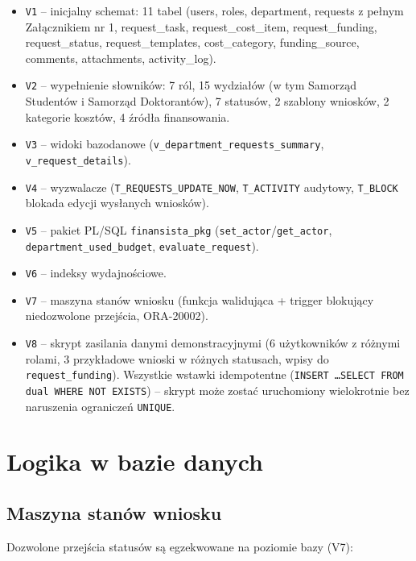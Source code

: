 \documentclass[12pt,a4paper]{article}
\begin{document}
\begin{itemize}[leftmargin=*]
  \item \texttt{V1} -- inicjalny schemat: 11 tabel (users, roles, department,
        requests z pełnym Załącznikiem nr 1, request\_task, request\_cost\_item,
        request\_funding, request\_status, request\_templates, cost\_category,
        funding\_source, comments, attachments, activity\_log).
  \item \texttt{V2} -- wypełnienie słowników: 7 ról, 15 wydziałów (w tym
        Samorząd Studentów i Samorząd Doktorantów), 7 statusów, 2 szablony
        wniosków, 2 kategorie kosztów, 4 źródła finansowania.
  \item \texttt{V3} -- widoki bazodanowe (\texttt{v\_department\_requests\_summary},
        \texttt{v\_request\_details}).
  \item \texttt{V4} -- wyzwalacze (\texttt{T\_REQUESTS\_UPDATE\_NOW},
        \texttt{T\_ACTIVITY} audytowy, \texttt{T\_BLOCK} blokada edycji wysłanych wniosków).
  \item \texttt{V5} -- pakiet PL/SQL \texttt{finansista\_pkg}
        (\texttt{set\_actor}/\texttt{get\_actor}, \texttt{department\_used\_budget},
        \texttt{evaluate\_request}).
  \item \texttt{V6} -- indeksy wydajnościowe.
  \item \texttt{V7} -- maszyna stanów wniosku (funkcja walidująca + trigger
        blokujący niedozwolone przejścia, ORA-20002).
  \item \texttt{V8} -- skrypt zasilania danymi demonstracyjnymi (6 użytkowników
        z różnymi rolami, 3 przykładowe wnioski w różnych statusach, wpisy
        do \texttt{request\_funding}). Wszystkie wstawki idempotentne
        (\texttt{INSERT \ldots SELECT FROM dual WHERE NOT EXISTS}) --
        skrypt może zostać uruchomiony wielokrotnie bez naruszenia
        ograniczeń \texttt{UNIQUE}.
\end{itemize}

\section{Logika w bazie danych}
\label{sec:plsql}

\subsection{Maszyna stanów wniosku}
Dozwolone przejścia statusów są egzekwowane na poziomie bazy (V7):
\end{document}
